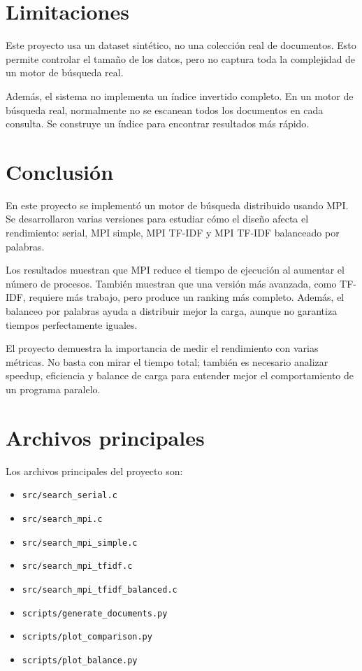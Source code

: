 \documentclass[12pt,letterpaper]{article}
\begin{document}
\section{Limitaciones}

Este proyecto usa un dataset sintético, no una colección real de documentos. Esto permite controlar el tamaño de los datos, pero no captura toda la complejidad de un motor de búsqueda real.

Además, el sistema no implementa un índice invertido completo. En un motor de búsqueda real, normalmente no se escanean todos los documentos en cada consulta. Se construye un índice para encontrar resultados más rápido.

\section{Conclusión}

En este proyecto se implementó un motor de búsqueda distribuido usando MPI. Se desarrollaron varias versiones para estudiar cómo el diseño afecta el rendimiento: serial, MPI simple, MPI TF-IDF y MPI TF-IDF balanceado por palabras.

Los resultados muestran que MPI reduce el tiempo de ejecución al aumentar el número de procesos. También muestran que una versión más avanzada, como TF-IDF, requiere más trabajo, pero produce un ranking más completo. Además, el balanceo por palabras ayuda a distribuir mejor la carga, aunque no garantiza tiempos perfectamente iguales.

El proyecto demuestra la importancia de medir el rendimiento con varias métricas. No basta con mirar el tiempo total; también es necesario analizar speedup, eficiencia y balance de carga para entender mejor el comportamiento de un programa paralelo.

\section{Archivos principales}

Los archivos principales del proyecto son:

\begin{itemize}
\item \texttt{src/search\_serial.c}
\item \texttt{src/search\_mpi.c}
\item \texttt{src/search\_mpi\_simple.c}
\item \texttt{src/search\_mpi\_tfidf.c}
\item \texttt{src/search\_mpi\_tfidf\_balanced.c}
\item \texttt{scripts/generate\_documents.py}
\item \texttt{scripts/plot\_comparison.py}
\item \texttt{scripts/plot\_balance.py}
\end{itemize}
\end{document}
